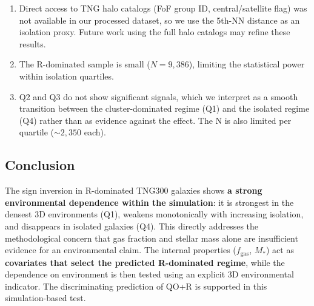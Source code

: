 \begin{enumerate}
    \item Direct access to TNG halo catalogs (FoF group ID, central/satellite
    flag) was not available in our processed dataset, so we use the
    5th-NN distance as an isolation proxy. Future work using the full
    halo catalogs may refine these results.

    \item The R-dominated sample is small ($N = 9{,}386$), limiting the
    statistical power within isolation quartiles.

    \item Q2 and Q3 do not show significant signals, which we interpret
    as a smooth transition between the cluster-dominated regime (Q1)
    and the isolated regime (Q4) rather than as evidence against the
    effect. The N is also limited per quartile ($\sim 2{,}350$ each).
\end{enumerate}

\subsection*{Conclusion}

The sign inversion in R-dominated TNG300 galaxies shows \textbf{a strong environmental dependence within the simulation}: it is strongest in the densest 3D environments
(Q1), weakens monotonically with increasing isolation, and disappears
in isolated galaxies (Q4). This directly addresses the
methodological concern that gas fraction and stellar mass alone are
insufficient evidence for an environmental claim. The internal
properties ($f_{\mathrm{gas}}$, $M_*$) act as \textbf{covariates that
select the predicted R-dominated regime}, while the dependence on
environment is then tested using an explicit 3D environmental indicator.
The discriminating prediction of QO+R is supported in this simulation-based test.
